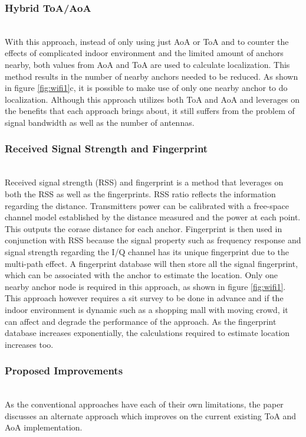 \documentclass{l4proj}
\begin{document}
\subsubsection{Hybrid ToA/AoA}~\\
With this approach, instead of only using just AoA or ToA and to counter the effects of complicated indoor environment and the limited amount of anchors nearby, both values from AoA and ToA are used to calculate localization. This method results in the number of nearby anchors needed to be reduced. As shown in figure \ref{fig:wifi1}c, it is possible to make use of only one nearby anchor to do localization. Although this approach utilizes both ToA and AoA and leverages on the benefits that each approach brings about, it still suffers from the problem of signal bandwidth as well as the number of antennas. \cite{hybrid}\\
\subsubsection{Received Signal Strength and Fingerprint}~\\
Received signal strength (RSS) and fingerprint is a method that leverages on both the RSS as well as the fingerprints. RSS ratio reflects the information regarding the distance. Transmitters power can be calibrated with a free-space channel model established by the distance measured and the power at each point. This outputs the corase distance for each anchor. Fingerprint is then used in conjunction with RSS because the signal property such as frequency response and signal strength regarding the I/Q channel has its unique fingerprint due to the multi-path effect. A fingerprint database will then store all the signal fingerprint, which can be associated with the anchor to estimate the location. Only one nearby anchor node is required in this approach, as shown in figure \ref{fig:wifi1}. This approach however requires a sit survey to be done in advance and if the indoor environment is dynamic such as a shopping mall with moving crowd, it can affect and degrade the performance of the approach. As the fingerprint database increases exponentially, the calculations required to estimate location increases too. \cite{rss}\\
\subsubsection{Proposed Improvements}~\\
As the conventional approaches have each of their own limitations, the paper discusses an alternate approach which improves on the current existing ToA and AoA implementation.\\
\end{document}
